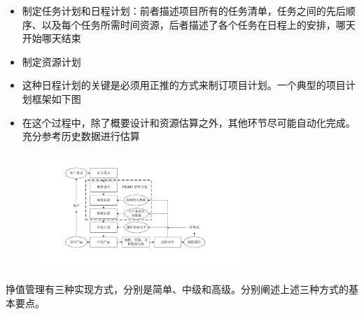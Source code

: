 \begin{solution}
\begin{itemize}
    \item 制定任务计划和日程计划：前者描述项目所有的任务清单，任务之间的先后顺序、以及每个任务所需时间资源，后者描述了各个任务在日程上的安排，哪天开始哪天结束
    \item 制定资源计划
    \item 这种日程计划的关键是必须用正推的方式来制订项目计划。一个典型的项目计划框架如下图
    \item 在这个过程中，除了概要设计和资源估算之外，其他环节尽可能自动化完成。充分参考历史数据进行估算
\end{itemize}

\begin{figure}[H]
    \vspace{-0.7em}
	\centering
	\includegraphics[width=0.7\textwidth]{通用计划框架.pdf}
    \vspace{-1em}
\end{figure}
\end{solution}



\begin{problem}[2023]
挣值管理有三种实现方式，分别是简单、中级和高级。分别阐述上述三种方式的基本要点。
\end{problem}

